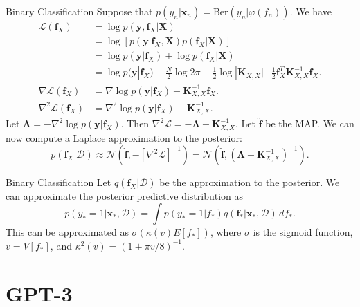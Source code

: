 \documentclass{beamer}
\begin{document}
\begin{frame}{Binary Classification}
    Suppose that $p(y_n | \boldsymbol{x}_n) = \text{Ber}(y_n | \varphi(f_n))$. We have
    \begin{align*}
        \mathcal{L}(\boldsymbol{f}_X) &= \log p(\boldsymbol{y}, \boldsymbol{f}_X | \boldsymbol{X}) \\
        &= \log[p(\boldsymbol{y} | \boldsymbol{f}_X, \boldsymbol{X})p(\boldsymbol{f}_X | \boldsymbol{X})] \\
        &= \log p(\boldsymbol{y} | \boldsymbol{f}_X) + \log p(\boldsymbol{f}_X | \boldsymbol{X}) \\
        &= \log p(\boldsymbol{y} | \boldsymbol{f}_X) -\frac{N}{2}\log 2\pi - \frac{1}{2}\log|\boldsymbol{K}_{X, X}| - \frac{1}{2}\boldsymbol{f}_X^T\boldsymbol{K}_{X, X}^{-1}\boldsymbol{f}_X. \\
        \nabla\mathcal{L}(\boldsymbol{f}_X) &= \nabla\log p(\boldsymbol{y} | \boldsymbol{f}_X) - \boldsymbol{K}_{X, X}^{-1}\boldsymbol{f}_X. \\
        \nabla^2 \mathcal{L}(\boldsymbol{f}_X) &= \nabla^2 \log p(\boldsymbol{y} | \boldsymbol{f}_X) - \boldsymbol{K}_{X, X}^{-1}.
    \end{align*}
    Let $\boldsymbol{\Lambda} = -\nabla^2 \log p(\boldsymbol{y} | \boldsymbol{f}_X)$. Then $\nabla^2 \mathcal{L} = -\boldsymbol{\Lambda} - \boldsymbol{K}_{X, X}^{-1}$. Let $\hat{\boldsymbol{f}}$ be the MAP. We can now compute a Laplace approximation to the posterior:
    \[
    p(\boldsymbol{f}_X | \mathcal{D}) \approx \mathcal{N}(\hat{\boldsymbol{f}}, -[\nabla^2 \mathcal{L}]^{-1}) = \mathcal{N}(\hat{\boldsymbol{f}}, (\boldsymbol{\Lambda} + \boldsymbol{K}_{X, X}^{-1})^{-1}).
    \]
\end{frame}

\begin{frame}{Binary Classification}
    Let $q(\boldsymbol{f}_X | \mathcal{D})$ be the approximation to the posterior. We can approximate the posterior predictive distribution as
    \[
    p(y_* = 1 | \boldsymbol{x}_*, \mathcal{D}) = \int p(y_* = 1 | f_*)q(\boldsymbol{f}_* | \boldsymbol{x}_*, \mathcal{D})\,df_*.
    \]
    This can be approximated as $\sigma(\kappa(v)E[f_*])$, where $\sigma$ is the sigmoid function, $v = V[f_*]$, and $\kappa^2(v) = (1 + \pi v / 8)^{-1}$.
\end{frame}

\section{GPT-3}
\end{document}
